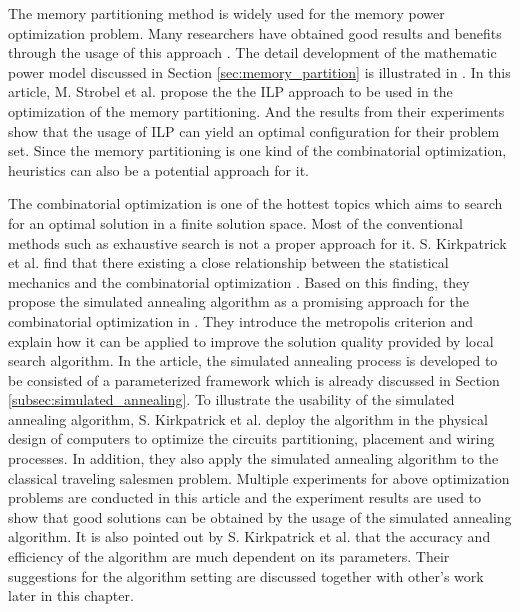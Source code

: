 \label{chap:related_work}
The memory partitioning method is widely used for the memory power
optimization problem. Many researchers have obtained good results
and benefits through the usage of this approach
\cite{Strobel2016, 876761, 4415607}.
The detail development of the mathematic power model discussed in
Section \ref{sec:memory_partition} is illustrated in \cite{Strobel2016}.
In this article, M. Strobel et al. propose the the ILP approach to
be used in the optimization of the memory partitioning. And the results
from their experiments show that the usage of ILP can yield an optimal
configuration for their problem set. Since the memory partitioning is
one kind of the combinatorial optimization, heuristics can also be a
potential approach for it.

The combinatorial optimization is one of the hottest topics which
aims to search for an optimal solution in a finite solution space.
Most of the conventional methods such as exhaustive search is not a proper
approach for it.
S. Kirkpatrick et al. find that there existing a close relationship
between the statistical mechanics and the combinatorial optimization
\cite{10.2307/1690046}.
Based on this finding, they propose the simulated annealing algorithm
as a promising approach for the combinatorial optimization in
\cite{10.2307/1690046}.
They introduce the metropolis criterion and explain how it can be
applied to improve the solution quality provided by local search
algorithm. In the article, the simulated annealing process is
developed to be consisted of a parameterized framework which is already
discussed in Section \ref{subsec:simulated_annealing}. To illustrate
the usability of the simulated annealing algorithm, S. Kirkpatrick et al.
deploy the algorithm in the physical design of computers to optimize the
circuits partitioning, placement and wiring processes.
In addition, they also apply the simulated annealing algorithm to the classical
traveling salesmen problem. Multiple experiments for above optimization
problems are conducted in this article and the experiment results are
used to show that good solutions can be obtained by the usage of the
simulated annealing algorithm. It is also pointed out by S. Kirkpatrick et al.
that the accuracy and efficiency of the algorithm are much dependent on
its parameters. Their suggestions for the algorithm setting are discussed
together with other's work later in this chapter.

